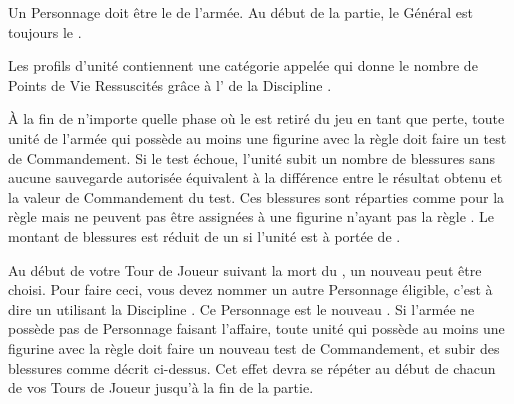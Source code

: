 \newcommand{\greatmonstrousrevenantrule}{\newrule{%
Le \monstrousrevenant{} gagne \thunderouscharge{} et sa taille de socle change en \unit{60x100}{\milli\meter}.
}}

\newcommand{\colossalzombiedragonrule}{%
La figurine gagne +1 en Capacité de Combat, la valeur de sa \innatedefence{} passe à ($ 3+ $), et sa taille de socle change en \unit{100x150}{\milli\meter}.
}







\startarmywiderules

\armywideruleentry{\masterofundeath}

Un Personnage doit être le \textbf{\master{}} de l'armée. Au début de la partie, le Général est toujours le \master{}.


\armywideruleentry{\invocation}

Les profils d'unité contiennent une catégorie appelée \invocation{} qui donne le nombre de Points de Vie Ressuscités grâce à l'\necromancysignaturespell{} de la Discipline \necromancy{}.

\closearmywiderules

\vspace*{1.5cm}
\startarmyspecialrules

\armyspecialruleentry{\ashestoashes}

À la fin de n'importe quelle phase où le \master{} est retiré du jeu en tant que perte, toute unité de l'armée qui possède au moins une figurine avec la règle \ashestoashes{} doit faire un test de Commandement. Si le test échoue, l'unité subit un nombre de blessures sans aucune sauvegarde autorisée équivalent à la différence entre le résultat obtenu et la valeur de Commandement du test. Ces blessures sont réparties comme pour la règle \unstable{} mais ne peuvent pas être assignées à une figurine n'ayant pas la règle \ashestoashes{}. Le montant de blessures est réduit de un si l'unité est à portée de \holdyourground{}.

Au début de votre Tour de Joueur suivant la mort du \master{}, un nouveau \master{} peut être choisi. Pour faire ceci, vous devez nommer un autre Personnage éligible, c'est à dire un \wizard{} utilisant la Discipline \necromancy{}. Ce Personnage est le nouveau \master{}. Si l'armée ne possède pas de Personnage faisant l'affaire, toute unité qui possède au moins une figurine avec la règle \ashestoashes{} doit faire un nouveau test de Commandement, et subir des blessures comme décrit ci-dessus. Cet effet devra se répéter au début de chacun de vos Tours de Joueur jusqu'à la fin de la partie.

